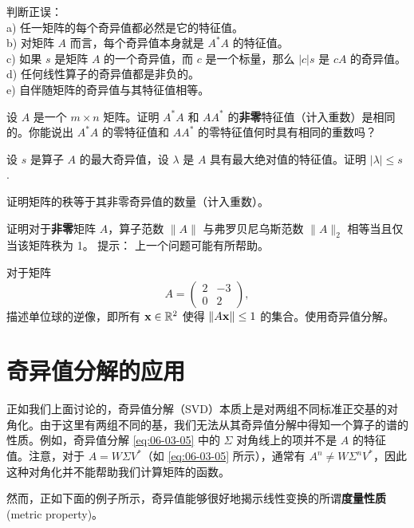 \begin{problemset}
\item \label{ex:06-03-07} 判断正误：
\\
a) 任一矩阵的每个奇异值都必然是它的特征值。
\\
b) 对矩阵 $A$ 而言，每个奇异值本身就是 $A^*A$ 的特征值。
\\
c) 如果 $s$ 是矩阵 $A$ 的一个奇异值，而 $c$ 是一个标量，那么 $|c|s$ 是 $cA$ 的奇异值。
\\
d) 任何线性算子的奇异值都是非负的。
\\
e) 自伴随矩阵的奇异值与其特征值相等。
\item \label{ex:06-03-08} 设 $A$ 是一个 $m \times n$ 矩阵。证明 $A^*A$ 和 $AA^*$ 的\textbf{非零}特征值（计入重数）是相同的。你能说出 $A^*A$ 的零特征值和 $AA^*$ 的零特征值何时具有相同的重数吗？
\item \label{ex:06-03-09} 设 $s$ 是算子 $A$ 的最大奇异值，设 $\lambda$ 是 $A$ 具有最大绝对值的特征值。证明 $|\lambda| \leq s$.~
\item \label{ex:06-03-10} 证明矩阵的秩等于其非零奇异值的数量（计入重数）。
\item \label{ex:06-03-11} 证明对于\textbf{非零}矩阵 $A$，算子范数 $\|A\|$ 与弗罗贝尼乌斯范数 $\|A\|_2$ 相等当且仅当该矩阵秩为 1。
{\heiti 提示：} 上一个问题可能有所帮助。
\item \label{ex:06-03-12} 对于矩阵 $$A = \begin{pmatrix} 2 & -3 \\ 0 & 2 \end{pmatrix},$$
描述单位球的逆像，即所有 $\mathbf{x} \in \mathbb{R}^2$ 使得 $\|A\mathbf{x}\| \leq 1$ 的集合。使用奇异值分解。
\end{problemset}


\section{奇异值分解的应用}\label{sec:06-04}

正如我们上面讨论的，奇异值分解（SVD）本质上是对两组不同标准正交基的对角化。由于这里有两组不同的基，我们无法从其奇异值分解中得知一个算子的谱的性质。例如，奇异值分解 \eqref{eq:06-03-05} 中的 $\Sigma$ 对角线上的项并不是 $A$ 的特征值。注意，对于 $A = W \Sigma V^*$（如 \eqref{eq:06-03-05} 所示），通常有 $A^n \ne W \Sigma^n V^*$，因此这种对角化并不能帮助我们计算矩阵的函数。

然而，正如下面的例子所示，奇异值能够很好地揭示线性变换的所谓\textbf{度量性质}(metric property)。

